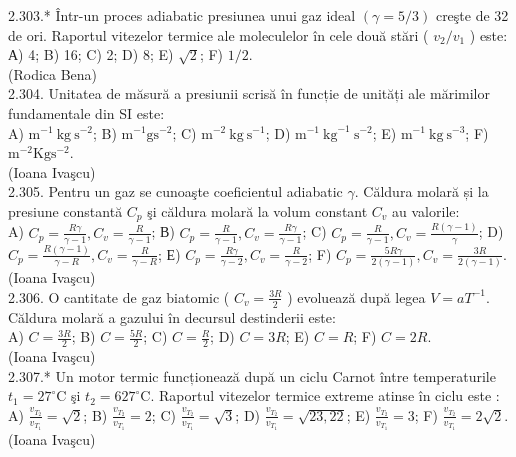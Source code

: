 \documentclass[10pt]{article}
\begin{document}
2.303.* Într-un proces adiabatic presiunea unui gaz ideal $(\gamma=5 / 3)$ creşte de 32 de ori. Raportul vitezelor termice ale moleculelor în cele două stări ( $v_{2} / v_{1}$ ) este:\\ А) 4; B) 16; C) 2; D) 8; E) $\sqrt{2}$; F) $1 / 2$.\\ (Rodica Bena)\\

2.304. Unitatea de măsură a presiunii scrisă în funcție de unități ale mărimilor fundamentale din SI este:\\ A) $\mathrm{m}^{-1} \mathrm{~kg} \mathrm{~s}^{-2}$; B) $\mathrm{m}^{-1} \mathrm{gs}^{-2}$; C) $\mathrm{m}^{-2} \mathrm{~kg} \mathrm{~s}^{-1}$; D) $\mathrm{m}^{-1} \mathrm{~kg}^{-1} \mathrm{~s}^{-2}$; E) $\mathrm{m}^{-1} \mathrm{~kg} \mathrm{~s}^{-3}$; F) $\mathrm{m}^{-2} \mathrm{Kg} \mathrm{s}^{-2}$.\\ (Ioana Ivaşcu)\\

2.305. Pentru un gaz se cunoaşte coeficientul adiabatic $\gamma$. Căldura molară și la presiune constantă $C_{p}$ şi căldura molară la volum constant $C_{v}$ au valorile:\\ A) $C_{p}=\frac{R \gamma}{\gamma-1} , C_{v}=\frac{R}{\gamma-1}$; В) $C_{p}=\frac{R}{\gamma-1} , C_{v}=\frac{R \gamma}{\gamma-1}$; C) $C_{p}=\frac{R}{\gamma-1} , C_{v}=\frac{R(\gamma-1)}{\gamma}$; D) $C_{p}=\frac{R(\gamma-1)}{\gamma-R} , C_{v}=\frac{R}{\gamma-R}$; Е) $C_{p}=\frac{R \gamma}{\gamma-2} , C_{v}=\frac{R}{\gamma-2}$; F) $C_{p}=\frac{5 R \gamma}{2(\gamma-1)} , C_{v}=\frac{3 R}{2(\gamma-1)}$.\\ (Ioana Ivaşcu)\\

2.306. O cantitate de gaz biatomic ( $C_{v}=\frac{3 R}{2}$ ) evoluează după legea $V=a T^{-1}$. Căldura molară a gazului în decursul destinderii este:\\ A) $C=\frac{3 R}{2}$; B) $C=\frac{5 R}{2}$; C) $C=\frac{R}{2}$; D) $C=3 R$; E) $C=R$; F) $C=2 R$.\\ (Ioana Ivaşcu)\\

2.307.* Un motor termic funcționează după un ciclu Carnot între temperaturile $t_{1}=27^{\circ} \mathrm{C}$ şi $t_{2}=627^{\circ} \mathrm{C}$. Raportul vitezelor termice extreme atinse în ciclu este :\\ A) $\frac{v_{T_{2}}}{v_{T_{1}}}=\sqrt{2}$; B) $\frac{v_{T_{2}}}{v_{T_{1}}}=2$; C) $\frac{v_{T_{2}}}{v_{T_{1}}}=\sqrt{3}$; D) $\frac{v_{T_{2}}}{v_{T_{1}}}=\sqrt{23,22}$; E) $\frac{v_{T_{2}}}{v_{T_{1}}}=3$; F) $\frac{v_{T_{2}}}{v_{T_{1}}}=2 \sqrt{2}$.\\ (Ioana Ivaşcu)\\
\end{document}
